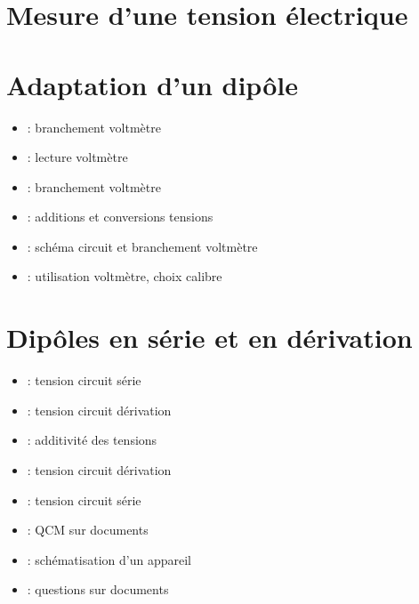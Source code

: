 \documentclass[12pt,a4paper]{article}
\begin{document}
	
	

\section{Mesure d'une tension électrique}







\section{Adaptation d'un dipôle}



\begin{myex}
	
		\begin{itemize}
			\item {} : branchement voltmètre
			\item {} : lecture voltmètre
			\item {} : branchement voltmètre
			\item {} : additions et conversions tensions
			\item {} : schéma circuit et branchement voltmètre
			\item {} : utilisation voltmètre, choix calibre
		\end{itemize}
	
\end{myex}

\section{Dipôles en série et en dérivation}





\begin{myex}
	
		\begin{itemize}
			\item {} : tension circuit série
			\item {} : tension circuit dérivation
			\item {} : additivité des tensions
			\item {} : tension circuit dérivation
			\item {} : tension circuit série
			\item {} : QCM sur documents
			\item {} : schématisation d'un appareil
			\item {} : questions sur documents
		\end{itemize}
	
\end{myex}
\end{document}
